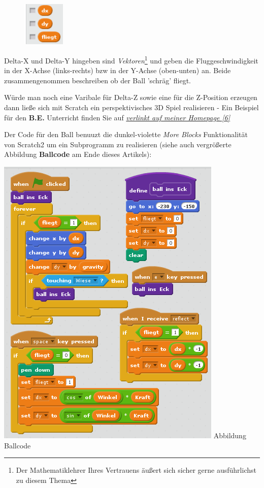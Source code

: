 \documentclass[10pt,a4paper,ngerman,twoside]{article} %
\begin{document}
\begin{multicols}{3}
\begin{figure}
\includegraphics[width=2cm]{scratch/fballvars.png}
\end{figure}
Delta-X und Delta-Y hingeben sind \textit{Vektoren}\footnote{Der Mathematiklehrer Ihres Vertrauens äußert sich sicher gerne ausführlichst zu diesem Thema} und geben die Fluggeschwindigkeit in der X-Achse (links-rechts) bzw in der Y-Achse (oben-unten) an. Beide zusammengenommen beschreiben ob der Ball 'schräg' fliegt. 

Würde man noch eine Varibale für Delta-Z sowie eine für die Z-Position erzeugen dann ließe sich mit Scratch ein perspektivisches 3D Spiel realisieren - Ein Beispiel für den \textbf{B.E.} Unterricht finden Sie auf \href{http://spielend-programmieren.at/en:tutorials:centralperspective}{\textit{verlinkt auf meiner Homepage [6]}}

Der Code für den Ball benuuzt die dunkel-violette \textit{More Blocks} Funktionalität von Scratch2 um ein Subprogramm zu realisieren 
(siehe auch vergrößerte Abbildung \textbf{Ballcode} am Ende dieses Artikels):
\begin{center}
\includegraphics[width=\linewidth]{scratch/fballcode.png}
\footnotesize{Abbildung Ballcode}
\end{center}


\end{multicols}
\end{document}
